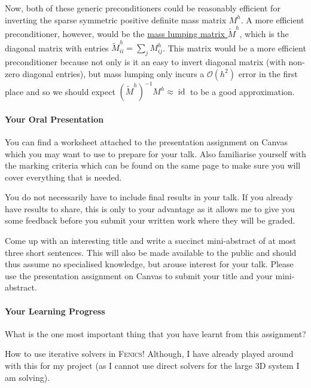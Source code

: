 \begin{enumerate}[(a)]
\begin{solution}
Now, both of these generic preconditioners could be reasonably efficient for inverting the sparse symmetric positive definite mass matrix $M^h$. A more efficient preconditioner, however, would be the \underline{mass lumping matrix $\tilde{M}^h$}, which is the diagonal matrix with entries $\tilde{M}^h_{ii} = \sum_j M^h_{ij}$.
This matrix would be a more efficient preconditioner because not only is it an easy to invert diagonal matrix (with non-zero diagonal entries), but mass lumping only incurs a $\mathcal{O}(h^2)$ error in the first place and so we should expect $(\tilde{M}^h)^{-1}M^h \approx \operatorname{id}$ to be a good approximation.


\end{solution}

\end{enumerate}

\newpage
\paragraph*{Your Oral Presentation}

You can find a worksheet attached to the presentation assignment on \textsf{Canvas} which you may want to use to prepare for your talk. Also familiarise yourself with the marking criteria which can be found on the same page to make sure you will cover everything that is needed.

You do not necessarily have to include final results in your talk. If you already have results to share, this is only to your advantage as it allows me to give you some feedback before you submit your written work where they will be graded.

Come up with an interesting title and write a succinct mini-abstract of at most three short sentences. This will also be made available to the public and should thus assume no specialised knowledge, but arouse interest for your talk. Please use the presentation assignment on \textsf{Canvas} to submit your title and your mini-abstract.

\paragraph*{Your Learning Progress}%

What is the one most important thing that you have learnt from this assignment?

\vspace*{3mm}
How to use iterative solvers in \textsc{Fenics}!
Although, I have already played around with this for my project (as I cannot use direct solvers for the large 3D system I am solving).

